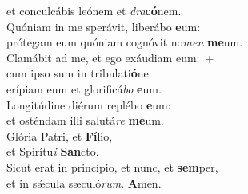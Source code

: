 \oddverse et conculcábis leónem et \textit{dra}\textbf{có}nem.\\
\evenverse Quóniam in me sperávit, liberábo \textbf{e}um:~\*\\
\evenverse prótegam eum quóniam cognóvit no\textit{men} \textbf{me}um.\\
\oddverse Clamábit ad me, et ego exáudiam eum:~+\\
\oddverse  cum ipso sum in tribulati\textbf{ó}ne:~\*\\
\oddverse erípiam eum et glorificá\textit{bo} \textbf{e}um.\\
\evenverse Longitúdine diérum replébo \textbf{e}um:~\*\\
\evenverse et osténdam illi salutá\textit{re} \textbf{me}um.\\
\oddverse Glória Patri, et \textbf{Fí}lio,~\*\\
\oddverse et Spirítu\textit{i} \textbf{San}cto.\\
\evenverse Sicut erat in princípio, et nunc, et \textbf{sem}per,~\*\\
\evenverse et in sǽcula sæculó\textit{rum}. \textbf{A}men.\\
